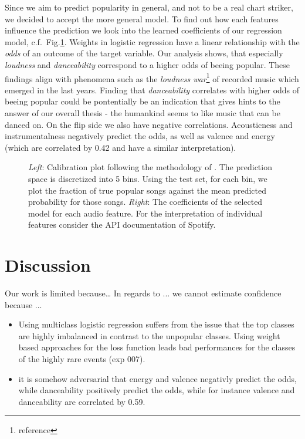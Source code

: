\documentclass{article}
\begin{document}
Since we aim to predict popularity in general, and not to be a real chart striker, we decided to accept the more general model.
To find out how each features influence the prediction we look into the learned coefficients of our regression model, c.f.~Fig.\ref{fig:logis_eval}.
Weights in logistic regression have a linear relationship with the \textit{odds} of an outcome of the target variable.
Our analysis shows, that especially \textit{loudness} and \textit{danceability} correspond to a higher odds of beeing popular.
These findings align with phenomena such as the \textit{loudness war}\footnote{reference} of recorded music which emerged in the last years.
Finding that \textit{danceability} correlates with higher odds of beeing popular could be pontentially be an indication that gives hints to the answer of our overall thesis - the humankind seems to like music that can be danced on.
On the flip side we also have negative correlations. 
Acousticness and instrumentalness negatively predict the odds, as well as valence and energy (which are correlated by 0.42 and have a similar interpretation).


\begin{figure}
  \caption{\textit{Left}: Calibration plot following the methodology of \cite{niculescu-mizilPredictingGoodProbabilities2005}. The prediction space is discretized into 5 bins. Using the test set, for each bin, we plot the fraction of true popular songs against the mean predicted probability for those songs. \textit{Right}: The coefficients of the selected model for each audio feature. For the interpretation of individual features consider the API documentation of Spotify.}
  \label{fig:logis_eval}
\end{figure}

  

\section{Discussion}
Our work is limited because\dots
In regards to ... we cannot estimate confidence because ...

\begin{itemize}
  \item Using multiclass logistic regression suffers from the issue that the top classes are highly imbalanced in contrast to the unpopular classes. Using weight based approaches for the loss function leads bad performances for the classes of the highly rare events (exp 007). 
  \item it is somehow adversarial that energy and valence negativly predict the odds, while danceability positively predict the odds, while for instance valence and danceability are correlated by 0.59.
\end{itemize}
\end{document}
